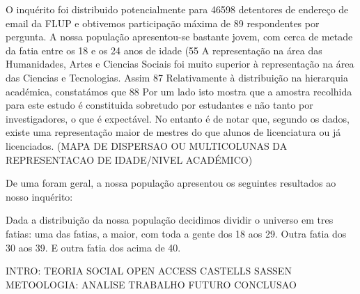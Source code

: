 O inquérito foi distribuido potencialmente para 46598 detentores de endereço de email da FLUP e obtivemos participação máxima de 89 respondentes por pergunta.
A nossa população apresentou-se bastante jovem, com cerca de metade da fatia entre os 18 e os 24 anos de idade (55%
A representação na área das Humanidades, Artes e Ciencias Sociais foi muito superior à representação na área das Ciencias e Tecnologias. Assim 87%
Relativamente à distribuição na hierarquia académica, constatámos que 88%
Por um lado isto mostra que a amostra recolhida para este estudo é constituida sobretudo por estudantes e não tanto por investigadores, o que é expectável. No entanto é de notar que, segundo os dados, existe uma representação maior de mestres do que alunos de licenciatura ou já licenciados.  (MAPA DE DISPERSAO OU MULTICOLUNAS DA REPRESENTACAO DE IDADE/NIVEL ACADÉMICO)

De uma foram geral, a nossa população apresentou os seguintes resultados ao nosso inquérito:


Dada a distribuição da nossa população decidimos dividir o universo em tres fatias: uma das fatias, a maior, com toda a gente dos 18 aos 29. Outra fatia dos 30 aos 39. E outra fatia dos acima de 40.




INTRO:
	TEORIA SOCIAL
	OPEN ACCESS
	CASTELLS
	SASSEN
METOOLOGIA:
ANALISE
TRABALHO FUTURO
CONCLUSAO
